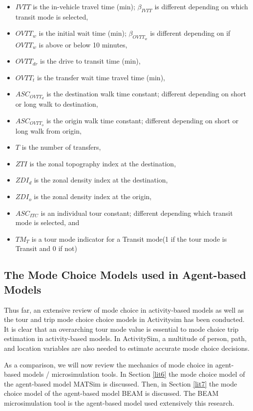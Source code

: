 \documentclass[3p, authoryear, review]{elsarticle} %
\providecommand{\tightlist}{%
  \setlength{\itemsep}{0pt}\setlength{\parskip}{0pt}}
\begin{document}
\begin{itemize}
\tightlist
\item
  \(IVTT\) is the in-vehicle travel time (min); \(\beta_{IVTT}\) is different depending on which transit mode is selected,
\item
  \(OVTT_w\) is the initial wait time (min); \(\beta_{OVTT_w}\) is different depending on if \(OVTT_w\) is above or below 10 minutes,
\item
  \(OVTT_{dr}\) is the drive to transit time (min),
\item
  \(OVTT_t\) is the transfer wait time travel time (min),\\
\item
  \(ASC_{OVTT_d}\) is the destination walk time constant; different depending on short or long walk to destination,
\item
  \(ASC_{OVTT_o}\) is the origin walk time constant; different depending on short or long walk from origin,
\item
  \(T\) is the number of transfers,
\item
  \(ZTI\) is the zonal topography index at the destination,
\item
  \(ZDI_d\) is the zonal density index at the destination,
\item
  \(ZDI_o\) is the zonal density index at the origin,
\item
  \(ASC_{ITC}\) is an individual tour constant; different depending which transit mode is selected, and
\item
  \(TM_{T}\) is a tour mode indicator for a Transit mode(1 if the tour mode is Transit and 0 if not)
\end{itemize}

\hypertarget{lit5}{%
\subsection{The Mode Choice Models used in Agent-based Models}\label{lit5}}

Thus far, an extensive review of mode choice in activity-based models as well as the tour and trip mode choice choice models in Activitysim has been conducted. It is clear that an overarching tour mode value is essential to mode choice trip estimation in activity-based models. In ActivitySim, a multitude of person, path, and location variables are also needed to estimate accurate mode choice decisions.

As a comparison, we will now review the mechanics of mode choice in agent-based models / microsimulation tools. In Section \ref{lit6} the mode choice model of the agent-based model MATSim is discussed. Then, in Section \ref{lit7} the mode choice model of the agent-based model BEAM is discussed. The BEAM microsimulation tool is the agent-based model used extensively this research.
\end{document}
